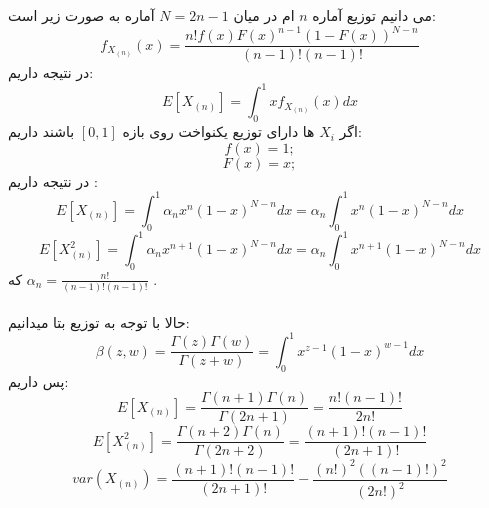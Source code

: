 \parte{}
می دانیم توزیع آماره $n$ ام در میان
$N = 2n-1$ آماره به صورت زیر است:\\
\[
    f_{X_{(n)}}(x) = \frac{n!f(x)F(x)^{n-1}(1-F(x))^{N-n}}
    {(n-1)!(n-1)!}  
\]
در نتیجه داریم:\\
\[
    E[X_{(n)}] = \int_{0}^{1}{xf_{X_{(n)}}(x)dx}
\]
اگر $X_i$ ها دارای توزیع یکنواخت روی بازه $[0,1]$
باشند داریم:\\
\[
    f(x) = 1;
\]
\[
    F(x) = x;
\]
در نتیجه داریم :\\
\[
    E[X_{(n)}] = \int_{0}^{1}{\alpha_n x^{n}(1-x)^{N-n}dx}
    = \alpha_n \int_{0}^{1}{x^{n}(1-x)^{N-n}dx}
\]
\[
    E[X_{(n)}^2] = \int_{0}^{1}{\alpha_n x^{n+1}(1-x)^{N-n}dx}
    = \alpha_n \int_{0}^{1}{x^{n+1}(1-x)^{N-n}dx}
\]
که $\alpha_n = \frac{n!}{(n-1)!(n-1)!}$
.\\\\
حالا با توجه به توزیع بتا میدانیم:\\
\[
    \beta(z,w) = \frac{\Gamma(z)\Gamma(w)}{\Gamma(z+w)}
    = \int_{0}^{1}{x^{z-1}(1-x)^{w-1}}dx
\]
پس داریم:\\
\[
    E[X_{(n)}] = \frac{\Gamma(n+1)\Gamma(n)}{\Gamma(2n+1)}
    = \frac{n!(n-1)!}{2n!}
\]
\[
    E[X_{(n)}^2] = \frac{\Gamma(n+2)\Gamma(n)}{\Gamma(2n+2)}
    = \frac{(n+1)!(n-1)!}{(2n+1)!}
\]
\[
    var(X_{(n)}) = \frac{(n+1)!(n-1)!}{(2n+1)!} - 
    \frac{(n!)^2((n-1)!)^2}{(2n!)^2}
\]